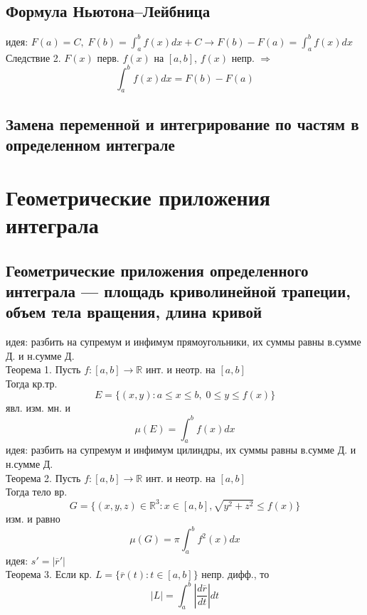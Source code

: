 \documentclass{article}
\begin{document}
\subsection{Формула Ньютона–Лейбница}
идея: $F(a) = C, \; F(b) = \int_a^b f(x) dx + C \rightarrow F(b)-F(a) = \int_a^b f(x) dx $ \\
Следствие 2. $F(x)$ перв. $f(x)$ на $[a,b]$, $f(x)$ непр. $\Rightarrow$
\begin{equation*}
    \int_a^b f(x) dx = F(b) - F(a)
\end{equation*}
\subsection{Замена переменной и интегрирование по частям в определенном интеграле}


\newpage
\section{Геометрические приложения интеграла}
\subsection{Геометрические приложения определенного интеграла — площадь криволинейной трапеции, объем тела вращения, длина кривой}
идея: разбить на супремум и инфимум прямоугольники, их суммы равны в.сумме Д. и н.сумме Д. \\
Теорема 1. Пусть $f:[a,b] \rightarrow \mathbb R$ инт. и неотр. на $[a,b]$ \\
Тогда кр.тр. 
\begin{equation*}
    E = \{ (x,y): a \leq x \leq b, \; 0 \leq y \leq f(x) \}
\end{equation*}
явл. изм. мн. и
\begin{equation*}
    \mu (E) = \int_a^b f(x) dx
\end{equation*}
идея: разбить на супремум и инфимум цилиндры, их суммы равны в.сумме Д. и н.сумме Д. \\
Теорема 2. Пусть $f:[a,b]\rightarrow\mathbb R$ инт. и неотр. на $[a,b]$ \\
Тогда тело вр.
\begin{equation*}
    G = \{ (x,y,z) \in \mathbb R^3: x \in [a,b], \sqrt{y^2+z^2} \leq f(x) \}
\end{equation*}
изм. и равно
\begin{equation*}
    \mu(G) = \pi \int_a^b f^2(x) dx
\end{equation*}
идея: $s' = |\overline{r}'|$ \\
Теорема 3. Если кр. $L = \{ \overline{r}(t): t \in [a,b] \}$ непр. дифф., то
\begin{equation*}
    |L| = \int_a^b |\frac{d\overline{r}}{dt}| dt
\end{equation*}
\end{document}
